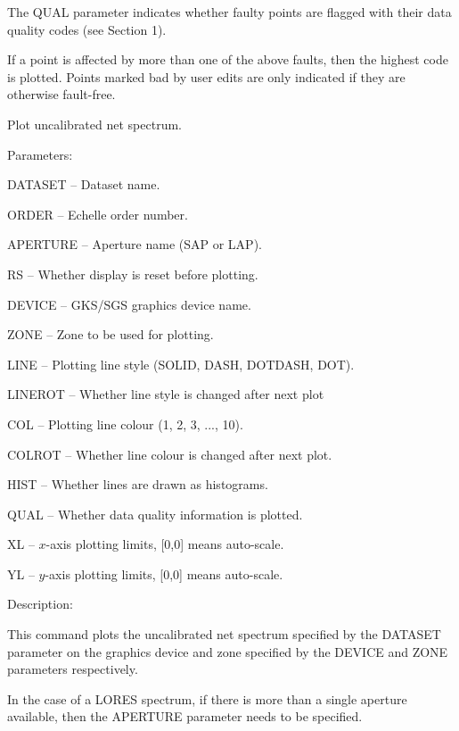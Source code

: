 \begin {description}
\begin {description}
The QUAL parameter indicates whether faulty points are flagged with
their data quality codes (see Section 1).

If a point is affected by more than one of the above faults, then
the highest code is plotted.
Points marked bad by user edits are only indicated if they are otherwise
fault-free.
\end {description}

\item [PLNET]
Plot uncalibrated net spectrum.

\begin {description}
\item Parameters:

\begin {description}
\item DATASET -- Dataset name.
\item ORDER -- Echelle order number.
\item APERTURE -- Aperture name (SAP or LAP).
\item RS -- Whether display is reset before plotting.
\item DEVICE -- GKS/SGS graphics device name.
\item ZONE -- Zone to be used for plotting.
\item LINE -- Plotting line style (SOLID, DASH, DOTDASH, DOT).
\item LINEROT -- Whether line style is changed after next plot
\item COL -- Plotting line colour (1, 2, 3, ..., 10).
\item COLROT -- Whether line colour is changed after next plot.
\item HIST -- Whether lines are drawn as histograms.
\item QUAL -- Whether data quality information is plotted.
\item XL -- $x$-axis plotting limits, [0,0] means auto-scale.
\item YL -- $y$-axis plotting limits, [0,0] means auto-scale.
\end {description}

\item Description:

This command plots the uncalibrated net spectrum specified by the DATASET
parameter on the graphics device and zone specified by the DEVICE and 
ZONE parameters respectively.

In the case of a LORES spectrum, if there is more than a single
aperture available, then the APERTURE parameter needs to be specified.


\end{description}
\end{description}
